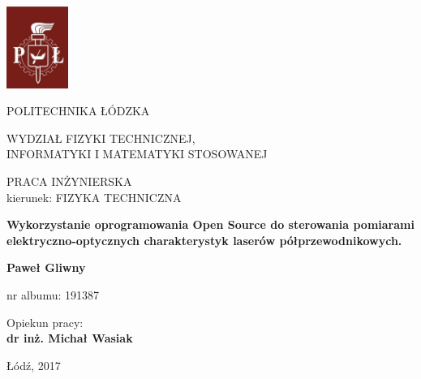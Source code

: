 \begin{titlepage}
 \begin{center}
  \includegraphics[width=0.15\textwidth]{logo.eps}

  \vspace{0.5cm}
  \large{POLITECHNIKA ŁÓDZKA}

  \vspace{1cm}
  \normalsize{WYDZIAŁ FIZYKI TECHNICZNEJ, \\
  INFORMATYKI I MATEMATYKI STOSOWANEJ}

  \vspace{1.5cm}
  \large{PRACA INŻYNIERSKA \\kierunek: FIZYKA TECHNICZNA}

  \vspace{2cm}
  \Large\textbf{{Wykorzystanie oprogramowania Open Source do
    sterowania pomiarami
    elektryczno-optycznych charakterystyk laserów
    półprzewodnikowych.}}

  \vspace{2cm}
  \large\textbf{Paweł Gliwny}

  \large{nr albumu: 191387}

  \vspace{1cm}
  \begin{flushright}
  \large{Opiekun pracy:\\ \textbf{dr inż. Michał Wasiak}}
  \end{flushright}

  \vfill
  \normalsize{Łódź, 2017}
  \end{center}
\end{titlepage}